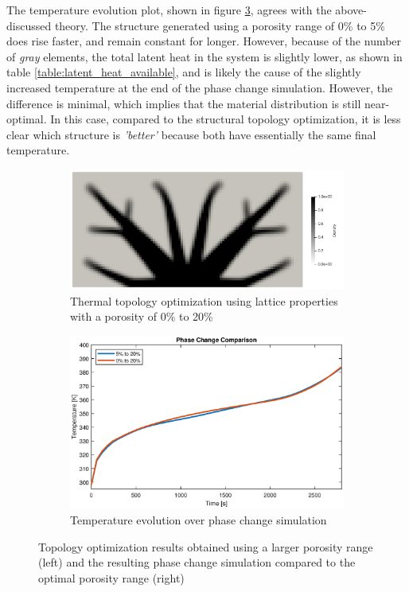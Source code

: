 The temperature evolution plot, shown in figure \ref{fig:phase_change_lattice}, agrees with the above-discussed theory. The structure generated using a porosity range of 0\% to 5\% does rise faster, and remain constant for longer. However, because of the number of \emph{gray} elements, the total latent heat in the system is slightly lower, as shown in table \ref{table:latent_heat_available}, and is likely the cause of the slightly increased temperature at the end of the phase change simulation. However, the difference is minimal, which implies that the material distribution is still near-optimal. In this case, compared to the structural topology optimization, it is less clear which structure is \emph{'better'} because both have essentially the same final temperature. 
\begin{figure}
  \begin{subfigure}{0.45\linewidth}
    \includegraphics[width=\linewidth]{figures/chapter_4/ThermalOptLattice0to20.png}
    \caption{Thermal topology optimization using lattice properties with a porosity of 0\% to 20\%}
    \label{fig:thermal_opt_0to20}
  \end{subfigure}
  \hfill
  \begin{subfigure}{0.5\linewidth}
    \centering
    \includegraphics[width=\linewidth]{figures/chapter_4/PhaseChangeComparisonLattice.eps}
    \caption{Temperature evolution over phase change simulation}
    \label{fig:phase_change_lattice}
  \end{subfigure}
  \caption{Topology optimization results obtained using a larger porosity range (left) and the resulting phase change simulation compared to the optimal porosity range (right)}
\end{figure}
  
